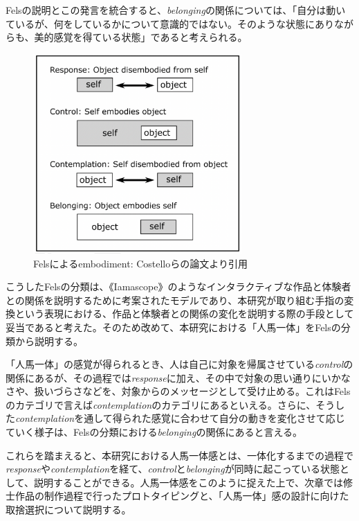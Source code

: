 Felsの説明とこの発言を統合すると、\textit{belonging}の関係については、「自分は動いているが、何をしているかについて意識的ではない。そのような状態にありながらも、美的感覚を得ている状態」であると考えられる。

\begin{figure}[H]
  \centering
  \includegraphics[width=8cm]{img/fels_diagram.png}
  \caption{Felsによるembodiment: Costelloらの論文より引用}
  \label{fig:fels_embodiment}
\end{figure}

こうしたFelsの分類は、《Iamascope》のようなインタラクティブな作品と体験者との関係を説明するために考案されたモデルであり、本研究が取り組む手指の変換という表現における、作品と体験者との関係の変化を説明する際の手段として妥当であると考えた。そのため改めて、本研究における「人馬一体」をFelsの分類から説明する。

「人馬一体」の感覚が得られるとき、人は自己に対象を帰属させている\textit{control}の関係にあるが、その過程では\textit{response}に加え、その中で対象の思い通りにいかなさや、扱いづらさなどを、対象からのメッセージとして受け止める。これはFelsのカテゴリで言えば\textit{contemplation}のカテゴリにあるといえる。さらに、そうした\textit{contemplation}を通して得られた感覚に合わせて自分の動きを変化させて応じていく様子は、Felsの分類における\textit{belonging}の関係にあると言える。

これらを踏まえると、本研究における人馬一体感とは、一体化するまでの過程で\textit{response}や\textit{contemplation}を経て、\textit{control}と\textit{belonging}が同時に起こっている状態として、説明することができる。人馬一体感をこのように捉えた上で、次章では修士作品の制作過程で行ったプロトタイピングと、「人馬一体」感の設計に向けた取捨選択について説明する。